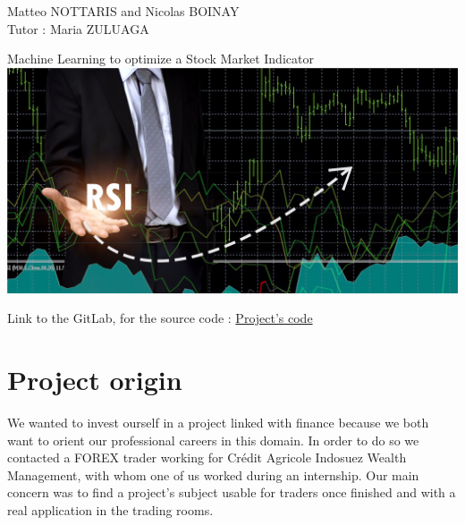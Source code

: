 \documentclass[]{article}
\begin{document}
\begin{titlepage}

\begin{flushleft}
Matteo NOTTARIS and Nicolas BOINAY \\
\bigskip
Tutor : Maria ZULUAGA
\end{flushleft}

\vspace*{\fill}  
\begin{center}  
     {\LARGE Machine Learning to optimize a Stock Market Indicator}\\[15mm]
     \includegraphics[scale=0.30]{image/rsi_bourse.png}
	 \centering
\end{center}
\vspace*{\fill} 
\begin{center}
Link to the GitLab, for the source code : \href{https://github.com/MatteoNottaris/MALIS-project}{Project's code}
\end{center}
\end{titlepage}

\doublespacing

\renewcommand*\contentsname{Summary}

\tableofcontents
\clearpage
\singlespacing

\section{Project origin}

\vskip 0.3cm
We wanted to invest ourself in a project linked with finance because we both want to orient our professional careers in this domain.
In order to do so we contacted a FOREX trader working for Crédit Agricole Indosuez Wealth Management, with whom one of us worked during an internship. Our main concern was to find a project's subject usable for traders once finished and with a real application in the trading rooms.
\end{document}
